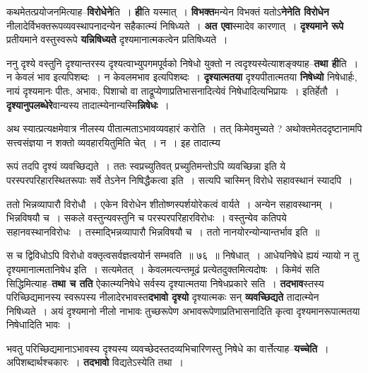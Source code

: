 \documentclass[article,12pt,a4paper]{memoir}
\begin{document}
	  \pstart कथमेतत्प्रयोजनमित्याह--\textbf{विरोधेने}ति । \textbf{ही}ति यस्मात् । \textbf{विभक्त}मन्येन विभक्तं यतोऽ\textbf{नेनेति विरोधेन} नीलादेर्विभक्तरूपव्यवस्थापनादन्येन सहैकात्म्यं निषिध्यते । \textbf{अत एवा}स्मादेव कारणात् । \textbf{दृश्यमाने रूपे} प्रतीयमाने वस्तुस्वरूपे \textbf{यन्निषिध्यते} दृश्यमानात्मकत्वेन प्रतिषिध्यते ।
	\pend
      

	  \pstart ननु दृश्ये वस्तुनि दृश्यान्तरस्य दृश्यत्वाभ्युपगमपूर्वको निषेधो युक्तो न त्वदृश्यस्येत्याशङ्क्याह--\textbf{तथा ही}ति । न केवलं भाव इत्यपिशब्दः । न केवलमभाव इत्यपिशब्दः । \textbf{दृश्यात्मतया} दृश्यपीतात्मतया \textbf{निषेध्यो} निषेधार्हः, नायं दृश्यमानः पीतः, अभावः, पिशाचो वा ताद्रूप्येणाप्रतिभासनादित्येवं निषेधादित्यभिप्रायः । इतिर्हेतौ । \textbf{दृश्यानुपलब्धेरे}वान्यस्य तादात्म्येनान्यस्मि\textbf{न्निषेधः} ।
	\pend
      

	  \pstart अथ स्यात्प्रत्यक्षमेवात्र नीलस्य पीतात्मताऽभावव्यवहारं करोति । तत् किमेवमुच्यते ? अथोक्तमेतददृष्टानामपि सत्त्वसंज्ञया न शक्तो व्यवहारयितुमिति चेत् । न । इह तादात्म्य \leavevmode{} 
	  
	रूपं तदपि दृश्यं व्यवच्छिद्यते । ततः स्वप्रच्युतिवत् प्रच्युतिमन्तोऽपि व्यवच्छिन्ना इति ये परस्परपरिहारस्थितरूपाः सर्वे तेऽनेन निषिद्धैकत्वा इति । सत्यपि चास्मिन् विरोधे सहावस्थानं स्यादपि ।  
	  
	ततो भिन्नव्यापारौ विरोधौ । एकेन विरोधेन शीतोष्णस्पर्शयोरेकत्वं वार्यते । अन्येन सहावस्थानम् । भिन्नविषयौ च । सकले वस्तुन्यवस्तुनि च परस्परपरिहारविरोधः । वस्तुन्येव कतिपये सहानवस्थानविरोधः । तस्माद्भिन्नव्यापारौ भिन्नविषयौ च । ततो नानयोरन्योन्यान्तर्भाव इति ॥ 
	  
	स च द्विविधोऽपि विरोधो वक्तृत्वसर्वज्ञत्वयोर्न सम्भवति ॥ ७६ ॥ निषेधात् । आधेयनिषेधे ह्ययं न्यायो न तु दृश्यमानात्मतानिषेध इति । सत्यमेतत् । केवलमत्यन्तमूढं प्रत्येतदुक्तमित्यदोषः । किमेवं सति सिद्धिमित्याह--\textbf{तथा च तति} ऐकात्म्यनिषेधे सर्वस्य दृश्यात्मतया निषेधप्रकारे सति । \textbf{तदभाव}स्तस्य परिच्छिद्यमानस्य स्वरूपस्य नीलादेरभावस्त\textbf{दभावो दृश्यो} दृश्यात्म\leavevmode{}कः सन् \textbf{व्यवच्छिद्यते} तादात्म्येन निषिध्यते । अयं दृश्यमानो नीलो नाभावः तुच्छरूपेण अभावरूपेणाप्रतिभासनादिति कृत्वा दृश्यमानरूपात्मतया निषेधादिति भावः ।
	\pend
      

	  \pstart भवतु परिच्छिद्यमानाऽभावस्य दृश्यस्य व्यवच्छेदस्तदव्यभिचारिणस्तु निषेधे का वार्त्तेत्याह--\textbf{यच्चेति} । अपिशब्दार्थश्चकारः । \textbf{तदभावो} विद्यतेऽस्येति तथा ।
	\pend
      
\end{document}
